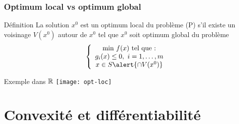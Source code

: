 \documentclass{beamer}
\newcommand{\R}{{\ensuremath\mathbb{R}}}
\begin{document}
\begin{frame}
{  }
\end{frame}

\begin{frame}
  \frametitle{Optimum local vs optimum global}

  \begin{block}{Définition}
    La solution $x^0$ est un optimum local du problème (P) s'il existe un voisinage
    $V(x^0)$ autour de $x^0$ tel que $x^0$ soit optimum global du problème
  \[
  \left\{
  \begin{array}{c}
    \text{min} \ f(x) \ \text{tel que :} \\
    g_i(x) \leq 0, \ i = 1, \dots, m \\
    x \in S \alert{\cap V(x^0)}
  \end{array}
  \right.
  \]
  \end{block}

  \begin{exampleblock}{Exemple dans $\R$}
    \centering
    \texttt{[image: opt-loc]}
  \end{exampleblock}
  
\end{frame}

\section{Convexité et différentiabilité}
\end{document}

